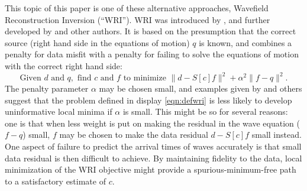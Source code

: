 This topic of this paper is one of these alternative approaches,
Wavefield Reconstruction Inversion (``WRI''). WRI was introduced by \cite{LeeuwenHerrmannWRI:13}, and further
developed by \cite{LeeuwenHerrmann:16,WangYingst:SEG16} and other
authors. It is based on the presumption that the correct source (right
hand side in the equations of motion) $q$ is
known, and combines a penalty for data misfit with a penalty for
failing to solve the equations of motion with the correct right hand side:
\begin{equation}
  \label{eqn:defwri}
  \mbox{Given } d \mbox{ and }q, \mbox{ find }c \mbox{ and }f \mbox{ to
    minimize }
  \|d -  S[c]f\|^2+\alpha^2\|f-q\|^2.
\end{equation}
The penalty parameter $\alpha$ may be chosen small, and examples given
by \cite{LeeuwenHerrmannWRI:13} and others suggest that the problem
defined in display \ref{eqn:defwri} is less likely to develop
uninformative local minima if $\alpha$ is small. This might be so for
several reasons: one is that when less weight is
put on making the residual in the wave equation ($f-q$) small, 
$f$ may be chosen to make the data residual $d-S[c]f$ small
instead. One aspect of failure to predict the arrival times of waves
accurately is that small data residual is then difficult to
achieve. By maintaining fidelity to
the data, local minimization of the WRI objective might provide a
spurious-minimum-free path to a satisfactory estimate of $c$. 

